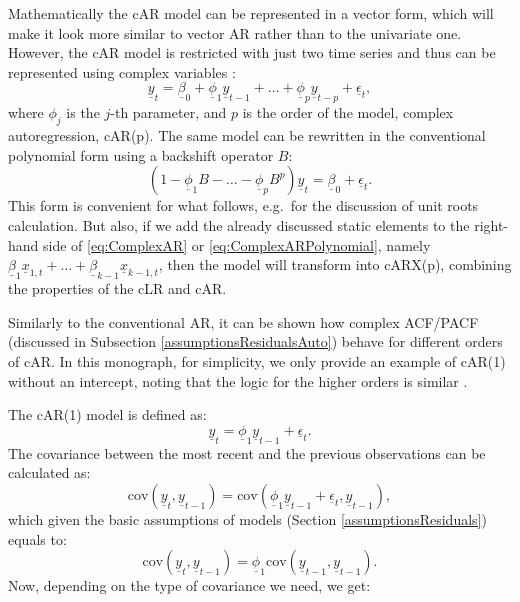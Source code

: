 \documentclass[
]{book}
\begin{document}
Mathematically the cAR model can be represented in a vector form, which will make it look more similar to vector AR rather than to the univariate one. However, the cAR model is restricted with just two time series and thus can be represented using complex variables \citep[this is also discussed in][]{Chandna2014}:
\begin{equation}
    \underline{y}_t = \underline{\beta}_0 + \underline{\phi}_1 \underline{y}_{t-1} + \dots + \underline{\phi}_p \underline{y}_{t-p} + \underline{\epsilon}_t ,
    \label{eq:ComplexAR}
\end{equation}
where \(\phi_j\) is the \(j\)-th parameter, and \(p\) is the order of the model, complex autoregression, cAR(p). The same model can be rewritten in the conventional polynomial form using a backshift operator \(B\):
\begin{equation}
    \left(1 - \underline{\phi}_1 B - \dots - \underline{\phi}_p B^p \right) \underline{y}_t  = \underline{\beta}_0 + \underline{\epsilon}_t .
    \label{eq:ComplexARPolynomial}
\end{equation}
This form is convenient for what follows, e.g.~for the discussion of unit roots calculation. But also, if we add the already discussed static elements to the right-hand side of \eqref{eq:ComplexAR} or \eqref{eq:ComplexARPolynomial}, namely \(\underline{\beta}_1 \underline{x}_{1,t} + \dots + \underline{\beta}_{k-1} \underline{x}_{k-1,t}\), then the model will transform into cARX(p), combining the properties of the cLR and cAR.

Similarly to the conventional AR, it can be shown how complex ACF/PACF (discussed in Subsection \ref{assumptionsResidualsAuto}) behave for different orders of cAR. In this monograph, for simplicity, we only provide an example of cAR(1) without an intercept, noting that the logic for the higher orders is similar \citep[ has similar derivations for the real-valued AR(p) in Section 8.3]{SvetunkovAdam}.

The cAR(1) model is defined as:
\begin{equation}
    \underline{y}_t = \underline{\phi}_1 \underline{y}_{t-1} + \underline{\epsilon}_t .
    \label{eq:ComplexAR1Step1}
\end{equation}
The covariance between the most recent and the previous observations can be calculated as:
\begin{equation}
    \mathrm{cov} \left(\underline{y}_t, \underline{y}_{t-1} \right) = \mathrm{cov} \left(\underline{\phi}_1 \underline{y}_{t-1} + \underline{\epsilon}_t, \underline{y}_{t-1} \right) ,
    \label{eq:ComplexAR1Step2}
\end{equation}
which given the basic assumptions of models (Section \ref{assumptionsResiduals}) equals to:
\begin{equation}
    \mathrm{cov} \left(\underline{y}_t, \underline{y}_{t-1} \right) = \underline{\phi}_1 \mathrm{cov} \left( \underline{y}_{t-1}, \underline{y}_{t-1} \right) .
    \label{eq:ComplexAR1Step3}
\end{equation}
Now, depending on the type of covariance we need, we get:
\end{document}
